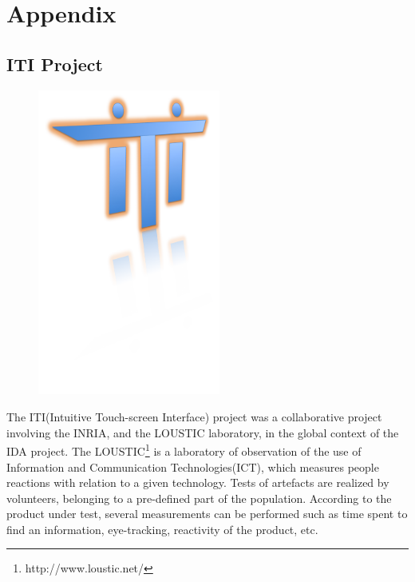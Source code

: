 
\part{Appendix}


\appendix

\chapter{ITI Project}
\label{ch:itiProject}

\begin{figure}
  \vspace{-5cm}
  \includegraphics[width=60mm]{part4/pics/itiLogo.png}
  \vspace{-5cm}
\end{figure}

The ITI(Intuitive Touch-screen Interface) project was a collaborative project involving the INRIA, and the LOUSTIC laboratory, in the global context of the IDA project. The LOUSTIC\footnote{http://www.loustic.net/} is a laboratory of observation of the use of Information and Communication Technologies(ICT), which measures people reactions with relation to a given technology. Tests of artefacts are realized by volunteers, belonging to a pre-defined part of the population. According to the product under test, several measurements can be performed such as time spent to find an information, eye-tracking, reactivity of the product, etc.\\

